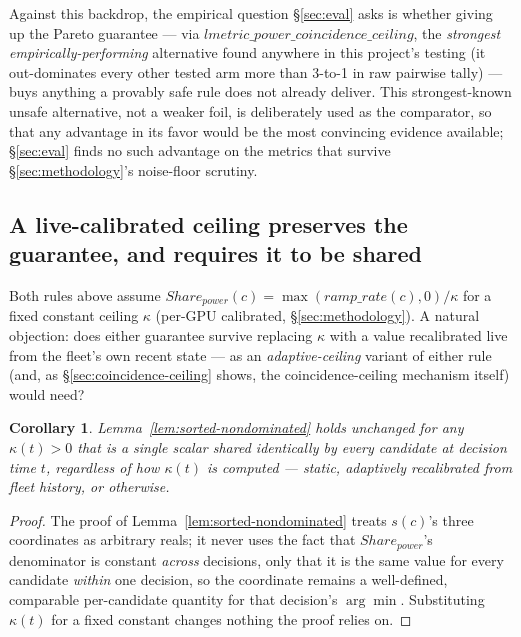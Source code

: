 \documentclass[sigconf,review,anonymous]{acmart}
\newtheorem{corollary}{Corollary}
\begin{document}
Against this backdrop, the empirical question \S\ref{sec:eval} asks is whether giving up the
Pareto guarantee --- via $\mathit{lmetric\_power\_coincidence\_ceiling}$, the \emph{strongest
empirically-performing} alternative found anywhere in this project's testing (it out-dominates
every other tested arm more than 3-to-1 in raw pairwise tally) --- buys anything a provably
safe rule does not already deliver. This strongest-known unsafe alternative, not a weaker
foil, is deliberately used as the comparator, so that any advantage in its favor would be the
most convincing evidence available; \S\ref{sec:eval} finds no such advantage on the metrics
that survive \S\ref{sec:methodology}'s noise-floor scrutiny.

\subsection{A live-calibrated ceiling preserves the guarantee, and requires it to be shared}
\label{sec:ceiling-invariance}

Both rules above assume $\mathit{Share_{power}}(c) = \max(\mathit{ramp\_rate}(c),0) / \kappa$
for a fixed constant ceiling $\kappa$ (per-GPU calibrated, \S\ref{sec:methodology}). A natural
objection: does either guarantee survive replacing $\kappa$ with a value recalibrated live
from the fleet's own recent state --- as an \emph{adaptive-ceiling} variant of either rule
(and, as \S\ref{sec:coincidence-ceiling} shows, the coincidence-ceiling mechanism itself)
would need?

\begin{corollary}
\label{cor:ceiling-invariance}
Lemma~\ref{lem:sorted-nondominated} holds unchanged for any $\kappa(t) > 0$ that is a single
scalar shared identically by every candidate at decision time $t$, regardless of how $\kappa(t)$
is computed --- static, adaptively recalibrated from fleet history, or otherwise.
\end{corollary}

\begin{proof}
The proof of Lemma~\ref{lem:sorted-nondominated} treats $s(c)$'s three coordinates as arbitrary
reals; it never uses the fact that $\mathit{Share_{power}}$'s denominator is constant
\emph{across} decisions, only that it is the same value for every candidate \emph{within} one
decision, so the coordinate remains a well-defined, comparable per-candidate quantity for that
decision's $\arg\min$. Substituting $\kappa(t)$ for a fixed constant changes nothing the proof
relies on.
\end{proof}
\end{document}
